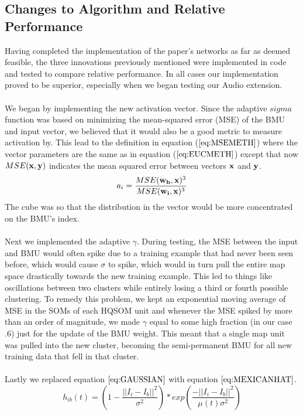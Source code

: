 \documentclass[a4paper,10pt]{article}
\begin{document}
\subsection{Changes to Algorithm and Relative Performance}
Having completed the implementation of the paper's networks as far as deemed feasible, the three
innovations previously mentioned were implemented in code and tested to compare relative
performance. In all cases our implementation proved to be superior, especially when we began
testing our Audio extension.
\\
\\
We began by implementing the new activation vector.  Since the adaptive $sigma$ function was based
on minimizing the mean-squared error (MSE) of the BMU and input vector, we believed that it would
also be a good metric to measure activation by.  This lead to the definition in equation
($\ref{eq:MSEMETH}$) where the vector parameters are the same as in equation ($\ref{eq:EUCMETH}$)
except that now $MSE(\bold{x},\bold{y})$ indicates the mean squared error between vectors
$\bold{x}$ and $\bold{y}$.
\begin{equation} \label{eq:MSEMETH}
 a_i = \frac{MSE(\bold{w_b}, \bold{x})^3}{MSE(\bold{w_i},\bold{x})^3}
\end{equation}
The cube was so that the distribution in the vector would be more concentrated on the BMU's index.
\\
\\
Next we implemented the adaptive $\gamma$.  During testing, the MSE between the input and BMU would
often spike due to a training example that had never been seen before, which would cause $\sigma$ to
spike, which would in turn pull the entire map space drastically towards the new training example. 
This led to things like oscillations between two clusters while entirely losing a third or fourth
possible clustering.  To remedy this problem, we kept an exponential moving average of MSE in the
SOMs of each HQSOM unit and whenever the MSE spiked by more than an order of magnitude, we made
$\gamma$ equal to some high fraction (in our case .6) just for the update of the BMU weight.  This
meant that a single map unit was pulled into the new cluster, becoming the semi-permanent BMU for
all new training data that fell in that cluster.
\\
\\
Lastly we replaced equation $\ref{eq:GAUSSIAN}$ with equation $\ref{eq:MEXICANHAT}$.
\begin{equation}\label{eq:MEXICANHAT}
 h_{ib}(t) = (1-\frac{||I_i-I_b||^2}{\sigma^2})*exp(\frac{-||I_i-I_b||^2}{\mu(t)\sigma^2})
\end{equation}
\end{document}
